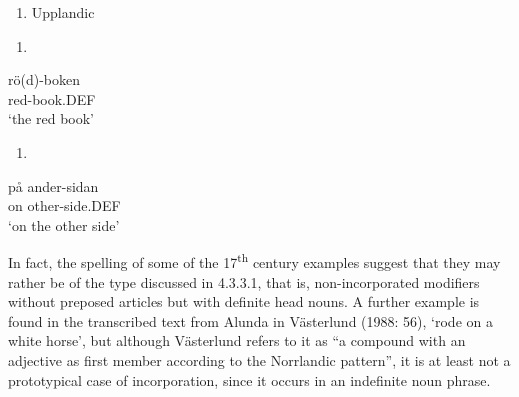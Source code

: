\begin{enumerate} %
\item 
Upplandic

\end{enumerate} %
\setcounter{listLFOxcviiileveli}{0}
\begin{enumerate} %
\item 
\end{enumerate} %
\ea\label{}
\gll rö(d)-boken\\


red-book.DEF\\ %


‘the red book’
\z


\begin{enumerate} %
\item 
\end{enumerate} %
\ea\label{}
\gll på  ander-sidan\\


on  other-side.DEF\\ %


 ‘on the other side’
\z


In fact, the spelling of some of the 17\textsuperscript{th} century examples suggest that they may rather be of the type discussed in 4.3.3.1, that is, non-incorporated modifiers without preposed articles but with definite head nouns. A further example is found in the transcribed text from Alunda in Västerlund (1988: 56),  ‘rode on a white horse’, but although Västerlund refers to it as “a compound with an adjective as first member according to the Norrlandic pattern”, it is at least not a prototypical case of incorporation, since it occurs in an indefinite noun phrase.


